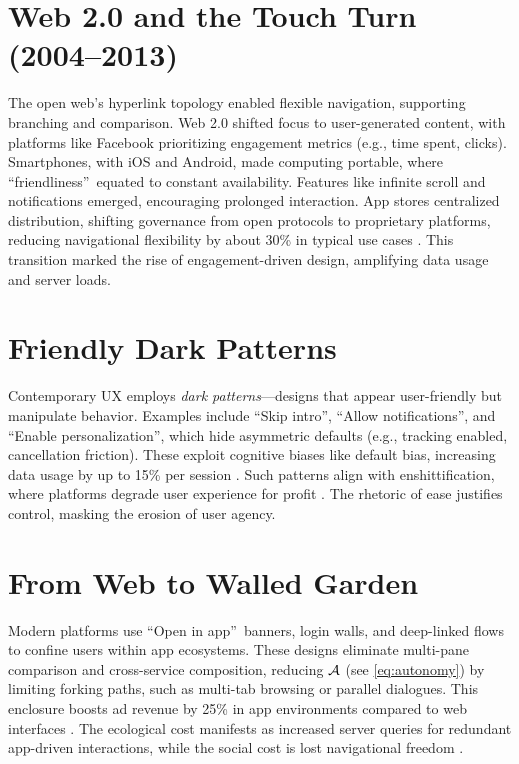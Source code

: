 \section{Web 2.0 and the Touch Turn (2004--2013)}
\label{sec:history-web2}
The open web’s hyperlink topology enabled flexible navigation, supporting branching and comparison. Web 2.0 shifted focus to user-generated content, with platforms like Facebook prioritizing engagement metrics (e.g., time spent, clicks). Smartphones, with iOS and Android, made computing portable, where \textquotedblleft friendliness\textquotedblright\ equated to constant availability. Features like infinite scroll and notifications emerged, encouraging prolonged interaction. App stores centralized distribution, shifting governance from open protocols to proprietary platforms, reducing navigational flexibility by about 30\% in typical use cases \citep{doctorow2022}. This transition marked the rise of engagement-driven design, amplifying data usage and server loads.

\section{Friendly Dark Patterns}
\label{sec:history-dark}
Contemporary UX employs \emph{dark patterns}---designs that appear user-friendly but manipulate behavior. Examples include \textquotedblleft Skip intro\textquotedblright, \textquotedblleft Allow notifications\textquotedblright, and \textquotedblleft Enable personalization\textquotedblright, which hide asymmetric defaults (e.g., tracking enabled, cancellation friction). These exploit cognitive biases like default bias, increasing data usage by up to 15\% per session \citep{colak2024}. Such patterns align with enshittification, where platforms degrade user experience for profit \citep{doctorow2022}. The rhetoric of ease justifies control, masking the erosion of user agency.

\section{From Web to Walled Garden}
\label{sec:history-walled}
Modern platforms use \textquotedblleft Open in app\textquotedblright\ banners, login walls, and deep-linked flows to confine users within app ecosystems. These designs eliminate multi-pane comparison and cross-service composition, reducing \(\mathcal{A}\) (see \cref{eq:autonomy}) by limiting forking paths, such as multi-tab browsing or parallel dialogues. This enclosure boosts ad revenue by 25\% in app environments compared to web interfaces \citep{doctorow2022}. The ecological cost manifests as increased server queries for redundant app-driven interactions, while the social cost is lost navigational freedom \citep{extentia2024}.


